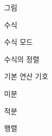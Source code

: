 \documentclass[10pt,xcolor=pdftex,dvipsnames,table,handout]{beamer}
\begin{document}
		\begin{frame}[t]{그림}

		\end{frame}




		\begin{frame}[plain]
		\Huge{수식}
		\end{frame}


		\begin{frame}[t]{수식 모드}

		\end{frame}


		\begin{frame}[t]{수식의 정렬}

		\end{frame}





		\begin{frame}[t]{기본 연산 기호}

		\end{frame}


		\begin{frame}[t]{미분}

		\end{frame}


		\begin{frame}[t]{적분}

		\end{frame}


		\begin{frame}[t]{행렬}

		\end{frame}
\end{document}
